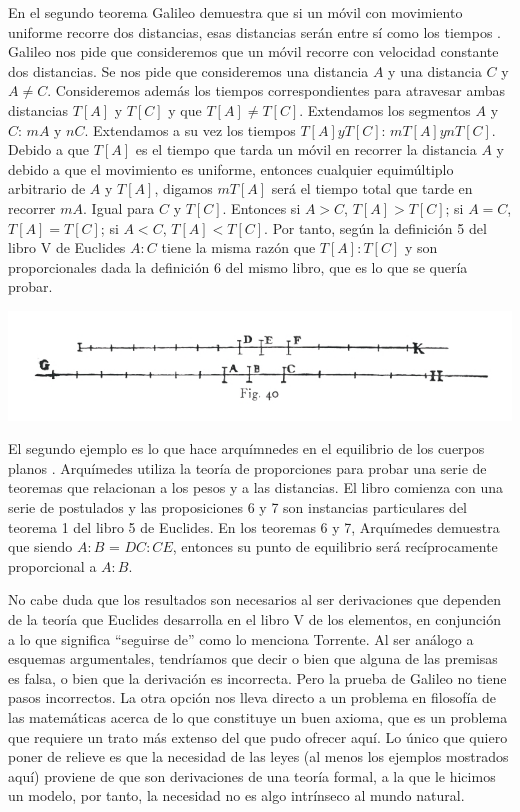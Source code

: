 En el segundo teorema Galileo demuestra que si un móvil con movimiento uniforme recorre dos distancias, esas distancias serán entre sí como los tiempos \cite[p. 215]{galtre}. Galileo nos pide que consideremos que un móvil recorre con velocidad constante dos distancias. Se nos pide que consideremos una distancia $A$ y una distancia $C$ y $A \neq C$. Consideremos además los tiempos correspondientes para atravesar ambas distancias $T[A]$ y $T[C]$ y que $T[A] \neq T[C]$. Extendamos los segmentos $A$ y $C$: $mA$ y $nC$. Extendamos a su vez los tiempos $T[A] y T[C]$: $mT[A] y nT[C]$.  Debido a que $T[A]$ es el tiempo que tarda un móvil en recorrer la distancia $A$ y debido a que el movimiento es uniforme, entonces cualquier equimúltiplo arbitrario de $A$ y $T[A]$, digamos $mT[A]$ será el tiempo total que tarde en recorrer $mA$. Igual para $C$ y $T[C]$. Entonces si $A > C$, $T[A] > T[C]$; si $A = C$, $T[A] = T[C]$; si $A < C$, $T[A] < T[C]$. Por tanto, según la definición 5 del libro V de Euclides \cite{Euclides1956} $A:C$ tiene la misma razón que $T[A]:T[C]$ y son proporcionales dada la definición 6 del mismo libro, que es lo que se quería probar.

\includegraphics[width=\textwidth]{fig40.jpg}

El segundo ejemplo es lo que hace arquímnedes en el equilibrio de los cuerpos planos \cite{Archimedes1897}. Arquímedes utiliza la teoría de proporciones para probar una serie de teoremas que relacionan a los pesos y a las distancias. El libro comienza con una serie de postulados y las proposiciones 6 y 7 son instancias particulares del teorema 1 del libro 5 de Euclides. En los teoremas 6 y 7, Arquímedes demuestra que siendo $A:B$ = $DC:CE$, entonces su punto de equilibrio será recíprocamente proporcional a $A:B$.

No cabe duda que los resultados son necesarios al ser derivaciones que dependen de la teoría que Euclides desarrolla en el libro V de los elementos, en conjunción a lo que significa ``seguirse de'' como lo menciona Torrente. Al ser análogo a esquemas argumentales, tendríamos que decir o bien que alguna de las premisas es falsa, o bien que la derivación es incorrecta. Pero la prueba de Galileo no tiene pasos incorrectos. La otra opción nos lleva directo a un problema en filosofía de las matemáticas acerca de lo que constituye un buen axioma, que es un problema que requiere un trato más extenso del que pudo ofrecer aquí. Lo único que quiero poner de relieve es que la necesidad de las leyes (al menos los ejemplos mostrados aquí) proviene de que son derivaciones de una teoría formal, a la que le hicimos un modelo, por tanto, la necesidad no es algo intrínseco al mundo natural.

